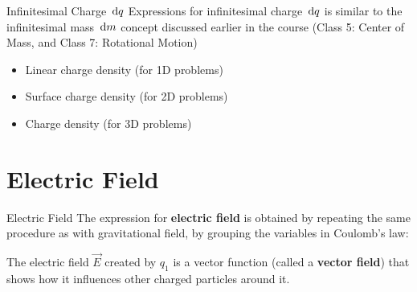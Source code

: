 \documentclass[12pt,aspectratio=169]{beamer}
\begin{document}
\begin{frame}{Infinitesimal Charge $\dl q$}
  Expressions for infinitesimal charge $\dl q$ is similar to the infinitesimal
  mass $\dl m$ concept discussed earlier in the course (Class 5:
  Center of Mass, and Class 7: Rotational Motion)
  \begin{itemize}
  \item Linear charge density (for 1D problems)


  \item\vspace{-.05in} Surface charge density (for 2D problems)


  \item\vspace{-.05in} Charge density (for 3D problems)

  \end{itemize}
\end{frame}

    

\section{Electric Field}

\begin{frame}{Electric Field}
  The expression for \textbf{electric field} is obtained by repeating the same
  procedure as with gravitational field, by grouping the variables in
  Coulomb's law:


  The electric field $\vec E$ created by $q_1$ is a vector function (called a
  \textbf{vector field}) that shows how it influences other charged particles
  around it.
\end{frame}
\end{document}
